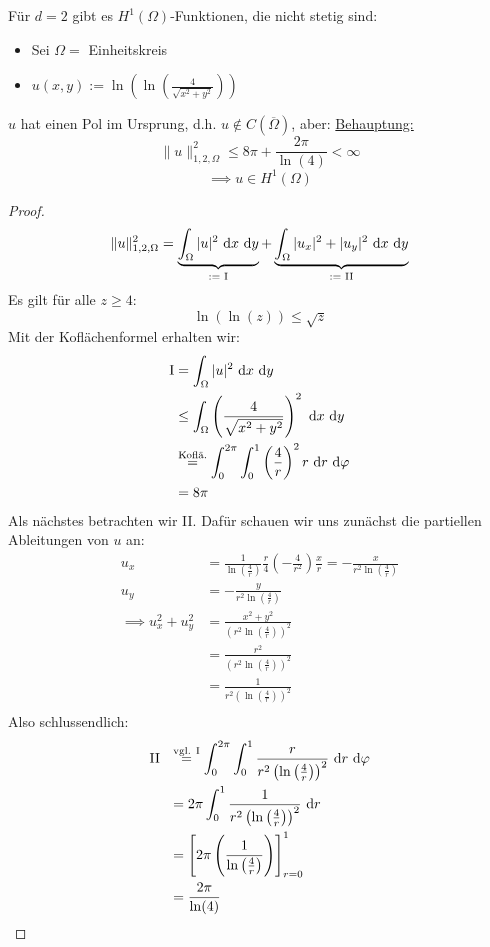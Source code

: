 \begin{beisp}
	Für $d=2$ gibt es $H^1(\Omega)$-Funktionen, die nicht stetig sind:
	\begin{itemize}
		\item Sei $\Omega=$ Einheitskreis
		\item $u(x,y):=\ln\left(\ln\left(\frac{4}{\sqrt{x^2+y^2}}\right)\right)$
	\end{itemize}
	$u$ hat einen Pol im Ursprung, d.h. $u\not\in C(\overline{\Omega})$, aber:\enter
	\ul{Behauptung:} 
	\[\|u\|^2_{1,2,\Omega}\leq 8\pi + \frac{2\pi}{\ln(4)}< \infty\]
	\[\implies u \in H^1(\Omega)\]
	\begin{proof}
	\[\|u\|^2_{1,2,\Omega} = \underbrace{\int_\Omega |u|^2 \text{ d} x \text{ d} y}_{:=\text{ I}} +
	\underbrace{\int_\Omega |u_x|^2 + |u_y|^2 \text{ d} x \text{ d} y}_{:=\text{ II}}\]
	Es gilt für alle $z\geq 4$:
	\[\ln(\ln(z))\leq \sqrt{z}\]
	Mit der Koflächenformel erhalten wir:
	\begin{align*}
		\text{I} &= \int_\Omega |u|^2 \text{ d} x \text{ d} y \\
			&\leq \int_\Omega \left(\frac{4}{\sqrt{x^2 + y^2}}\right)^2 \text{ d} x \text{ d} y \\
			&\stackrel{\text{Koflä.}}{=} \int_0^{2\pi}\int_0^1\left(\frac{4}{r}\right)^2 r \text{ d} r \text{ d} \varphi \\
			&= 8 \pi
	\end{align*}
	Als nächstes betrachten wir II. Dafür schauen wir uns zunächst die partiellen Ableitungen von $u$ an:
	\begin{align*}
		u_x &= \frac{1}{\ln\left(\frac{4}{r}\right)}\frac{r}{4}\left(-\frac{4}{r^2}\right)\frac{x}{r} = - \frac{x}{r^2\ln\left(\frac{4}{r}\right)} \\
		u_y &= - \frac{y}{r^2\ln\left(\frac{4}{r}\right)} \\
		\implies u_x^2 + u_y^2 &= \frac{x^2+y^2}{\left(r^2\ln\left(\frac{4}{r}\right)\right)^2} \\
		&= \frac{r^2}{\left(r^2\ln\left(\frac{4}{r}\right)\right)^2} \\
		&= \frac{1}{r^2\left(\ln\left(\frac{4}{r}\right)\right)^2} \\
	\end{align*}
	Also schlussendlich:
	\begin{align*}
		\text{II} ~~ &\stackrel{\text{vgl. I}}{=} \int_0^{2\pi}\int_0^1\frac{r}{r^2\left(\ln\left(\frac{4}{r}\right)\right)^2} \text{ d} r \text{ d} \varphi \\
			 &= 2\pi \int_0^1 \frac{1}{r^2\left(\ln\left(\frac{4}{r}\right)\right)^2} \text{ d} r \\
			 &=\left[2\pi\left(\frac{1}{\ln\left(\frac{4}{r}\right)}\right)\right]_{r=0}^1 \\
			 &= \frac{2\pi}{\ln(4)}
	\end{align*}
\end{proof}
\end{beisp}

